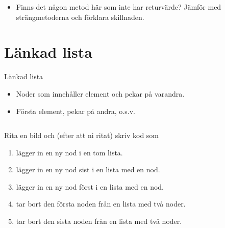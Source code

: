 \begin{frame}
  \begin{question}
    \begin{itemize}
      \item Finns det någon metod här som inte har returvärde? Jämför med 
        strängmetoderna och förklara skillnaden.
    \end{itemize}
  \end{question}
\end{frame}


\section{Länkad lista}

\begin{frame}[fragile]
  \begin{block}{Länkad lista}
    \begin{itemize}
      \item Noder som innehåller element och pekar på varandra.
      \item Första element, pekar på andra, o.s.v.
    \end{itemize}
  \end{block}

  \pause

  \inputminted{python}{src/node.py}
\end{frame}

\begin{frame}
  \begin{exercise}
    Rita en bild och (efter att ni ritat) skriv kod som
    \begin{enumerate}
      \item lägger in en ny nod i en tom lista.
      \item lägger in en ny nod sist i en lista med en nod.
      \item lägger in en ny nod först i en lista med en nod.
      \item tar bort den första noden från en lista med två noder.
      \item tar bort den sista noden från en lista med två noder.
    \end{enumerate}
  \end{exercise}

\end{frame}

